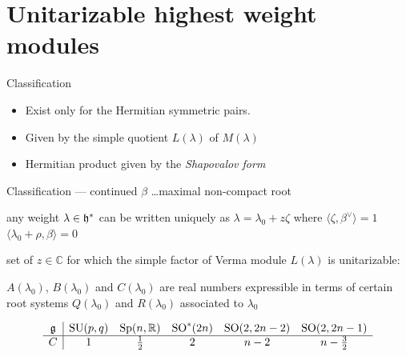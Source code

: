 \documentclass[10pt]{beamer}
\begin{document}
\section{Unitarizable highest weight modules}
%

\begin{frame}{Classification}
\begin{itemize}
	\item Exist only for the Hermitian symmetric pairs. 
	\item Given by the simple quotient $L(\lambda)$ of $M(\lambda)$
	\item Hermitian product given by the \emph{Shapovalov form}
\end{itemize}
\end{frame}

\begin{frame}{Classification --- continued}
$\beta$ \ldots maximal non-compact root

any weight $\lambda \in \mathfrak{h}^*$ can be written uniquely as $\lambda = \lambda_0 + z \zeta$ where $\langle \zeta, \beta^\vee \rangle = 1$ \et $\langle \lambda_0 + \rho,\beta \rangle = 0$


\pause
set of $z \in \mathbb{C}$ for which the simple factor of Verma module $L(\lambda)$ is unitarizable:
	
\begin{center}
\end{center}
	
	$A(\lambda_0)$, $B(\lambda_0)$ and $C(\lambda_0)$ are real numbers expressible in terms of certain root systems $Q(\lambda_0)$ and $R(\lambda_0)$ associated to $\lambda_0$
\pause	
\vspace{-0.5cm}
\begin{table}[h]
\[\begin{array}{c|ccccc}
\mathfrak{g} & \mathrm{SU}(p,q) & \mathrm{Sp}(n,\mathbb{R}) & \mathrm{SO}^*(2n) & \mathrm{SO}(2,2n-2) & \mathrm{SO}(2,2n-1) \\\hline
C & 1 & \frac{1}{2} & 2 & n-2 & n-\frac{3}{2}
\end{array}\]
\end{table}
\end{frame}
\end{document}
